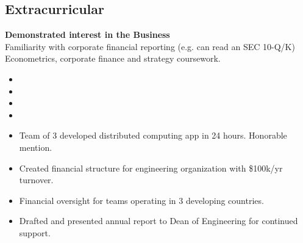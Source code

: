 \documentclass[margin]{res}
\begin{document}
\begin{sloppypar}
\begin{resume}
\section{Extracurricular}
\textbf{Demonstrated interest in the Business} \\
Familiarity with corporate financial reporting (e.g. can read an SEC 10-Q/K) \\
Econometrics, corporate finance and strategy coursework.
\begin{itemize}
    \item {}
    \item {}
    \item {}
    \item {}
\end{itemize}
    \begin{itemize}
        \item Team of 3 developed distributed computing app in 24 hours. Honorable mention.
    \end{itemize}
    \begin{itemize}
        \item Created financial structure for engineering organization with \$100k/yr turnover. 
        \item Financial oversight for teams operating in 3 developing countries.
        \item Drafted and presented annual report to Dean of Engineering for continued support. 
    \end{itemize}




\end{resume}
\end{sloppypar}
\end{document}

